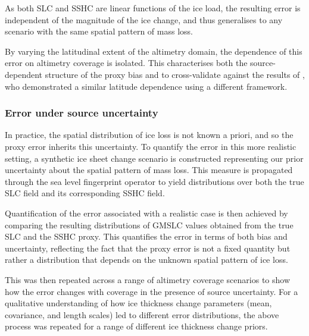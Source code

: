 As both SLC and SSHC are linear functions of the ice load, the resulting error is independent of the magnitude of the ice change, and thus generalises to any scenario with the same spatial pattern of mass loss.

By varying the latitudinal extent of the altimetry domain, the dependence of this error on altimetry coverage is isolated. This characterises both the source-dependent structure of the proxy bias and to cross-validate against the results of \textcite{lickleyBiasEstimatesGlobal2018}, who demonstrated a similar latitude dependence using a different framework.

\subsubsection{Error under source uncertainty}


In practice, the spatial distribution of ice loss is not known a priori, and so the proxy error inherits this uncertainty. To quantify the error in this more realistic setting, a synthetic ice sheet change scenario is constructed representing our prior uncertainty about the spatial pattern of mass loss. This measure is propagated through the sea level fingerprint operator to yield distributions over both the true SLC field and its corresponding SSHC field.

Quantification of the error associated with a realistic case is then achieved by comparing the resulting distributions of GMSLC values obtained from the true SLC and the SSHC proxy. This quantifies the error in terms of both bias and uncertainty, reflecting the fact that the proxy error is not a fixed quantity but rather a distribution that depends on the unknown spatial pattern of ice loss.

This was then repeated across a range of altimetry coverage scenarios to show how the error changes with coverage in the presence of source uncertainty. For a qualitative understanding of how ice thickness change parameters (mean, covariance, and length scales) led to different error distributions, the above process was repeated for a range of different ice thickness change priors.
